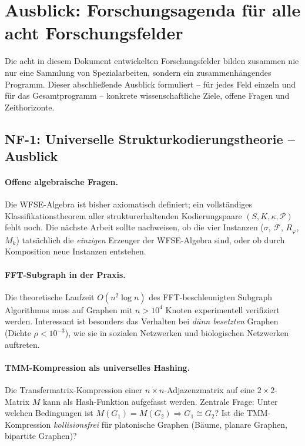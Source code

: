 ﻿\documentclass[a4paper,12pt]{scrreprt}
\theoremstyle{definition}
\begin{document}
\section*{Ausblick: Forschungsagenda für alle acht Forschungsfelder}
\label{sec:ausblick_all}

Die acht in diesem Dokument entwickelten Forschungsfelder bilden zusammen
nie nur eine Sammlung von Spezialarbeiten, sondern ein zusammenhängendes
Programm. Dieser abschließende Ausblick formuliert -- für jedes Feld einzeln
und für das Gesamtprogramm -- konkrete wissenschaftliche Ziele, offene
Fragen und Zeithorizonte.

\subsection*{NF-1: Universelle Strukturkodierungstheorie -- Ausblick}

\paragraph{Offene algebraische Fragen.}
Die WFSE-Algebra ist bisher axiomatisch definiert; ein vollständiges
Klassifikationstheorem aller strukturerhaltenden Kodierungspaare
$(S, K, \kappa, \mathcal{P})$ fehlt noch. Die nächste Arbeit sollte
nachweisen, ob die vier Instanzen ($\sigma$, $\mathcal{F}$, $R_\varphi$,
$M_k$) tatsächlich die \emph{einzigen} Erzeuger der WFSE-Algebra sind,
oder ob durch Komposition neue Instanzen entstehen.

\paragraph{FFT-Subgraph in der Praxis.}
Die theoretische Laufzeit $O(n^2 \log n)$ des FFT-beschleu\-nigten
Subgraph Algorithmus muss auf Graphen mit $n > 10^4$ Knoten
experimentell verifiziert werden. Interessant ist besonders das
Verhalten bei \emph{dünn besetzten} Graphen
(Dichte $\rho < 10^{-3}$), wie sie in sozialen Netzwerken und
biologischen Netzwerken auftreten.

\paragraph{TMM-Kompression als universelles Hashing.}
Die Transfermatrix-Kompression einer $n\times n$-Adjazenzmatrix
auf eine $2\times 2$-Matrix $M$ kann als Hash-Funktion aufgefasst werden.
Zentrale Frage: Unter welchen Bedingungen ist
$M(G_1) = M(G_2) \Rightarrow G_1 \cong G_2$? Ist die TMM-Kompression
\emph{kollisionsfrei} für platonische Graphen (Bäume, planare Graphen,
bipartite Graphen)?
\end{document}
